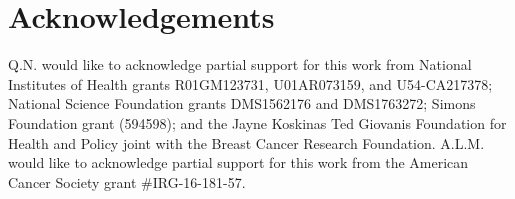 \documentclass[11pt]{article}
\begin{document}
\section*{Acknowledgements}
Q.N. would like to acknowledge partial support for this work from National Institutes of Health grants R01GM123731, U01AR073159, and U54-CA217378; National Science Foundation grants DMS1562176 and DMS1763272; Simons Foundation grant (594598); and the Jayne Koskinas Ted Giovanis Foundation for Health and Policy joint with the Breast Cancer Research Foundation. A.L.M. would like to acknowledge partial support for this work from the American Cancer Society grant \#IRG-16-181-57.




\end{document}
